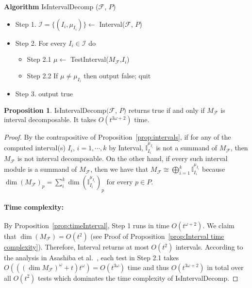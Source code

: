 \documentclass[11pt]{article}
\theoremstyle{definition}
\newtheorem{proposition}[theorem]{Proposition}
\newcommand{\I}{\mathbb{I}}
\newcommand{\Pb}{P}
\newcommand{\Fcal}{\mathcal{F}}
\newcommand{\NN}{t}
\begin{document}
\noindent
{\bf Algorithm} {\sc IsIntervalDecomp} ($\mathcal F$, $\Pb$)\label{algorithm:isintervaldecomp}
\begin{itemize}
    \item Step 1. ${\mathcal I=\{(I_i,\mu_{I_i})\}}\leftarrow$ {\sc Interval}($\mathcal F$, $\Pb$)
    \item Step 2. For every $I_i\in {\mathcal I}$ do
    \begin{itemize}
        \item Step 2.1 $\mu\leftarrow$ {\sc TestInterval}($M_{\mathcal F}$,$I_i$) 
        \item Step 2.2 If $\mu\not = \mu_{I_i}$ then output false; quit
    \end{itemize}
    \item Step 3. output true
\end{itemize}
\begin{proposition}\label{prop:complexity for testing interval decomposability}
{\sc IsIntervalDecomp}$(\mathcal F$, $\Pb)$ returns true if and only if $M_{\mathcal F}$ is interval decomposable. It takes $O(\NN^{3\omega+2})$ time.
\end{proposition}
\begin{proof}
By the contrapositive of Proposition~\ref{prop:intervals}, 
if for any of the computed interval(s) $I_i$, $i=1,\cdots,k$ by {\sc Interval}, $\I_{I_i}^{\mu_{I_i}}$
is not a summand of $M_{\mathcal F}$, then $M_{\mathcal F}$ is not interval decomposable. On the other hand, if 
every such interval module is a summand of $M_{\mathcal F}$, then we have that $M_{\mathcal F}\cong \bigoplus_{i=1}^k \I_{I_i}^{\mu_{I_i}}$ because $\dim (M_{\Fcal})_p= \sum_i^k \dim (\I_{I_i}^{\mu_{I_i}})_p$ for every $p\in \Pb$.

\paragraph{Time complexity:} By Proposition~\ref{prop:timeInterval}, Step 1 runs in time $O(\NN^{\omega+2})$.
We claim that $\dim(M_{\Fcal})=O(\NN^2)$ (see Proof of Proposition~\ref{prop:Interval time complexity}).
Therefore, {\sc Interval} returns at most $O(\NN^2)$ intervals.
According to the analysis in Asashiba et al.~\cite{asashiba2018interval},
each test in Step 2.1 takes $O(((\dim M_{\Fcal})^\omega + \NN)\NN^{\omega})=O(\NN^{3\omega})$ time and thus $O(\NN^{3\omega+2})$ in total over all $O(t^2)$ tests which
dominates the time complexity of {\sc IsIntervalDecomp}.
\end{proof}
\end{document}
